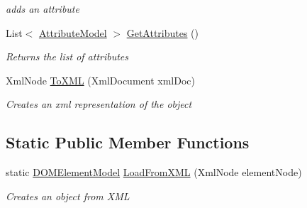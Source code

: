 \begin{DoxyCompactItemize}
\begin{DoxyCompactList}\small\item\em adds an attribute \end{DoxyCompactList}\item 
List$<$ \hyperlink{class_web_analyzer_1_1_models_1_1_data_model_1_1_attribute_model}{Attribute\+Model} $>$ \hyperlink{class_web_analyzer_1_1_models_1_1_data_model_1_1_d_o_m_element_model_a26b205e403ba3838d31995d413424403}{Get\+Attributes} ()
\begin{DoxyCompactList}\small\item\em Returns the list of attributes \end{DoxyCompactList}\item 
Xml\+Node \hyperlink{class_web_analyzer_1_1_models_1_1_data_model_1_1_d_o_m_element_model_a837f358bb57a34f2b0427b7b7adec954}{To\+X\+M\+L} (Xml\+Document xml\+Doc)
\begin{DoxyCompactList}\small\item\em Creates an xml representation of the object \end{DoxyCompactList}\end{DoxyCompactItemize}
\subsection*{Static Public Member Functions}
\begin{DoxyCompactItemize}
\item 
static \hyperlink{class_web_analyzer_1_1_models_1_1_data_model_1_1_d_o_m_element_model}{D\+O\+M\+Element\+Model} \hyperlink{class_web_analyzer_1_1_models_1_1_data_model_1_1_d_o_m_element_model_a03824b9e7af2471a63594d4776d461ff}{Load\+From\+X\+M\+L} (Xml\+Node element\+Node)
\begin{DoxyCompactList}\small\item\em Creates an object from X\+M\+L \end{DoxyCompactList}\end{DoxyCompactItemize}

